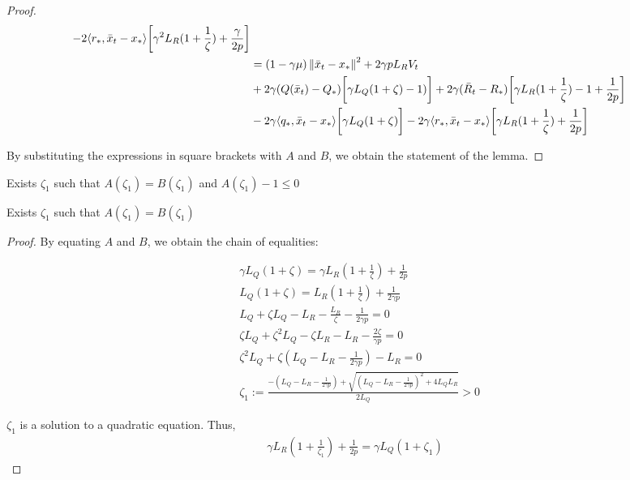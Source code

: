 \begin{proof}
\begin{align}
\begin{split}
            - 2\langle r_*, \bar{x}_t - x_*\rangle\biggr[ \gamma^2 L_R(1+\frac{1}{\zeta}) + \frac{\gamma}{2p} \biggr] \\
            &= (1 - \gamma \mu)\left\|\bar{x}_t - x_*\right\|^2 + 2 \gamma p L_R V_t \\
            &+ 2\gamma (Q(\bar{x}_t) - Q_*)\biggr[ \gamma L_Q (1+\zeta) - 1) \biggr] 
            + 2\gamma (\bar{R}_t - R_*)\biggr[ \gamma L_R (1+\frac{1}{\zeta}) - 1 + \frac{1}{2p} \biggr] \\
            &- 2\gamma \langle q_*, \bar{x}_t - x_*\rangle\biggr[ \gamma L_Q(1+\zeta)  \biggr]
            - 2\gamma \langle r_*, \bar{x}_t - x_*\rangle\biggr[ \gamma L_R(1+\frac{1}{\zeta}) + \frac{1}{2p} \biggr]
        \end{split}
    \end{align}
        
By substituting the expressions in square brackets with $A$ and $B$, we obtain the statement of the lemma.
\end{proof}

\begin{lemma}\label{lem:Technical}
    Exists $\zeta_1$ such that $A(\zeta_1) = B(\zeta_1)$ and $A(\zeta_1) - 1 \leq 0$
\end{lemma}
\begin{sublemma}\label{sublem:sublemma_1}
    Exists $\zeta_1$ such that $A(\zeta_1) = B(\zeta_1)$
\end{sublemma}
\begin{proof}
    By equating $A$ and $B$, we obtain the chain of equalities:

    \begin{align}
        &\gamma L_Q(1+\zeta)= \gamma L_R(1+\frac{1}{\zeta}) + \frac{1}{2p} \\
        &L_Q(1+\zeta) = L_R(1+\frac{1}{\zeta}) + \frac{1}{2\gamma p} \\
        &L_Q + \zeta L_Q - L_R - \frac{L_R}{\zeta} - \frac{1}{2\gamma p} = 0 \\
        &\zeta L_Q + \zeta^2 L_Q - \zeta L_R - L_R - \frac{2\zeta}{\gamma p} = 0\\
        &\zeta^2 L_Q + \zeta (L_Q - L_R - \frac{1}{2\gamma p}) - L_R = 0 \\
        &\zeta_{1} := \frac{-(L_Q - L_R - \frac{1}{2\gamma p}) + \sqrt{(L_Q - L_R - \frac{1}{2\gamma p})^2 + 4 L_Q L_R}}{2L_Q} > 0
    \end{align}
    
    $\zeta_{1}$ is a solution to a quadratic equation. Thus,
    \begin{align}
        \gamma L_R (1+\frac{1}{\zeta_1}) + \frac{1}{2p} = \gamma L_Q (1+\zeta_1) \label{eq:St_5}
    \end{align}
\end{proof}


